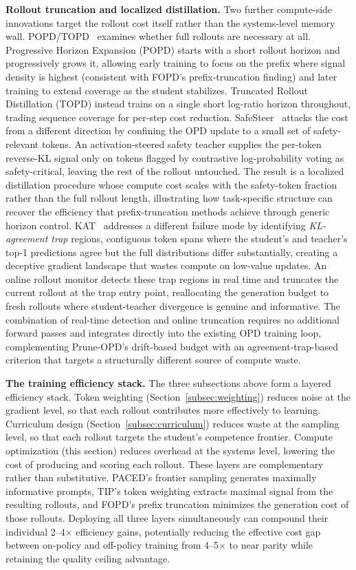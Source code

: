 \documentclass{article} %
\begin{document}
\textbf{Rollout truncation and localized distillation.} Two further compute-side innovations target the rollout cost itself rather than the systems-level memory wall. POPD/TOPD~\citep{2605.31490} examines whether full rollouts are necessary at all. Progressive Horizon Expansion (POPD) starts with a short rollout horizon and progressively grows it, allowing early training to focus on the prefix where signal density is highest (consistent with FOPD's prefix-truncation finding) and later training to extend coverage as the student stabilizes. Truncated Rollout Distillation (TOPD) instead trains on a single short log-ratio horizon throughout, trading sequence coverage for per-step cost reduction. SafeSteer~\citep{2606.02530} attacks the cost from a different direction by confining the OPD update to a small set of safety-relevant tokens. An activation-steered safety teacher supplies the per-token reverse-KL signal only on tokens flagged by contrastive log-probability voting as safety-critical, leaving the rest of the rollout untouched. The result is a localized distillation procedure whose compute cost scales with the safety-token fraction rather than the full rollout length, illustrating how task-specific structure can recover the efficiency that prefix-truncation methods achieve through generic horizon control. KAT~\citep{2606.09471} addresses a different failure mode by identifying \emph{KL-agreement trap} regions, contiguous token spans where the student's and teacher's top-1 predictions agree but the full distributions differ substantially, creating a deceptive gradient landscape that wastes compute on low-value updates. An online rollout monitor detects these trap regions in real time and truncates the current rollout at the trap entry point, reallocating the generation budget to fresh rollouts where student-teacher divergence is genuine and informative. The combination of real-time detection and online truncation requires no additional forward passes and integrates directly into the existing OPD training loop, complementing Prune-OPD's drift-based budget with an agreement-trap-based criterion that targets a structurally different source of compute waste.

\textbf{The training efficiency stack.} The three subsections above form a layered efficiency stack. Token weighting (Section~\ref{subsec:weighting}) reduces noise at the gradient level, so that each rollout contributes more effectively to learning. Curriculum design (Section~\ref{subsec:curriculum}) reduces waste at the sampling level, so that each rollout targets the student's competence frontier. Compute optimization (this section) reduces overhead at the systems level, lowering the cost of producing and scoring each rollout. These layers are complementary rather than substitutive. PACED's frontier sampling generates maximally informative prompts, TIP's token weighting extracts maximal signal from the resulting rollouts, and FOPD's prefix truncation minimizes the generation cost of those rollouts. Deploying all three layers simultaneously can compound their individual 2--4$\times$ efficiency gains, potentially reducing the effective cost gap between on-policy and off-policy training from 4--5$\times$ to near parity while retaining the quality ceiling advantage.
\end{document}
